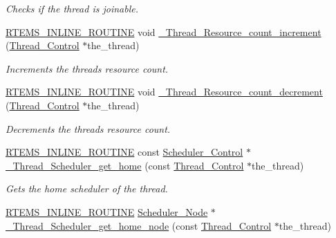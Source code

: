 \begin{DoxyCompactItemize}
\begin{DoxyCompactList}\small\item\em Checks if the thread is joinable. \end{DoxyCompactList}\item 
\mbox{\hyperlink{group__RTEMSScoreBaseDefs_gac216239df231d5dbd15e3520b0b9313f}{R\+T\+E\+M\+S\+\_\+\+I\+N\+L\+I\+N\+E\+\_\+\+R\+O\+U\+T\+I\+NE}} void \mbox{\hyperlink{group__RTEMSScoreThread_gade8b030c16456ceae1596e2e3fab9808}{\+\_\+\+Thread\+\_\+\+Resource\+\_\+count\+\_\+increment}} (\mbox{\hyperlink{struct__Thread__Control}{Thread\+\_\+\+Control}} $\ast$the\+\_\+thread)
\begin{DoxyCompactList}\small\item\em Increments the thread\textquotesingle{}s resource count. \end{DoxyCompactList}\item 
\mbox{\hyperlink{group__RTEMSScoreBaseDefs_gac216239df231d5dbd15e3520b0b9313f}{R\+T\+E\+M\+S\+\_\+\+I\+N\+L\+I\+N\+E\+\_\+\+R\+O\+U\+T\+I\+NE}} void \mbox{\hyperlink{group__RTEMSScoreThread_ga778547cad4f7dd7524abb2b9aec0a239}{\+\_\+\+Thread\+\_\+\+Resource\+\_\+count\+\_\+decrement}} (\mbox{\hyperlink{struct__Thread__Control}{Thread\+\_\+\+Control}} $\ast$the\+\_\+thread)
\begin{DoxyCompactList}\small\item\em Decrements the thread\textquotesingle{}s resource count. \end{DoxyCompactList}\item 
\mbox{\hyperlink{group__RTEMSScoreBaseDefs_gac216239df231d5dbd15e3520b0b9313f}{R\+T\+E\+M\+S\+\_\+\+I\+N\+L\+I\+N\+E\+\_\+\+R\+O\+U\+T\+I\+NE}} const \mbox{\hyperlink{struct__Scheduler__Control}{Scheduler\+\_\+\+Control}} $\ast$ \mbox{\hyperlink{group__RTEMSScoreThread_ga740b780440af6ea6cf7a3c13373629e3}{\+\_\+\+Thread\+\_\+\+Scheduler\+\_\+get\+\_\+home}} (const \mbox{\hyperlink{struct__Thread__Control}{Thread\+\_\+\+Control}} $\ast$the\+\_\+thread)
\begin{DoxyCompactList}\small\item\em Gets the home scheduler of the thread. \end{DoxyCompactList}\item 
\mbox{\hyperlink{group__RTEMSScoreBaseDefs_gac216239df231d5dbd15e3520b0b9313f}{R\+T\+E\+M\+S\+\_\+\+I\+N\+L\+I\+N\+E\+\_\+\+R\+O\+U\+T\+I\+NE}} \mbox{\hyperlink{structScheduler__Node}{Scheduler\+\_\+\+Node}} $\ast$ \mbox{\hyperlink{group__RTEMSScoreThread_ga080a177afc4fc254a1081485cd89f75d}{\+\_\+\+Thread\+\_\+\+Scheduler\+\_\+get\+\_\+home\+\_\+node}} (const \mbox{\hyperlink{struct__Thread__Control}{Thread\+\_\+\+Control}} $\ast$the\+\_\+thread)

\end{DoxyCompactItemize}
